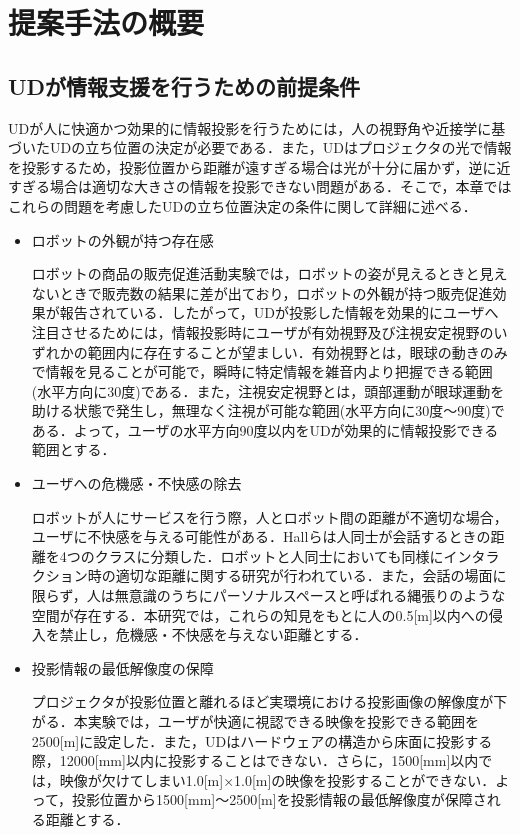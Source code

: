 \documentclass[12pt]{sonota/aislab}
\begin{document}
\section{提案手法の概要}
\subsection{UDが情報支援を行うための前提条件}
UDが人に快適かつ効果的に情報投影を行うためには，人の視野角や近接学に基づいたUDの立ち位置の決定が必要である．また，UDはプロジェクタの光で情報を投影するため，投影位置から距離が遠すぎる場合は光が十分に届かず，逆に近すぎる場合は適切な大きさの情報を投影できない問題がある．そこで，本章ではこれらの問題を考慮したUDの立ち位置決定の条件に関して詳細に述べる．

\begin{itemize}
 \item ロボットの外観が持つ存在感
    
    ロボットの商品の販売促進活動実験\cite{販売促進}では，ロボットの姿が見えるときと見えないときで販売数の結果に差が出ており，ロボットの外観が持つ販売促進効果が報告されている．したがって，UDが投影した情報を効果的にユーザへ注目させるためには，情報投影時にユーザが有効視野及び注視安定視野のいずれかの範囲内に存在することが望ましい．有効視野とは，眼球の動きのみで情報を見ることが可能で，瞬時に特定情報を雑音内より把握できる範囲(水平方向に30度)である．また，注視安定視野とは，頭部運動が眼球運動を助ける状態で発生し，無理なく注視が可能な範囲(水平方向に30度〜90度)である．よって，ユーザの水平方向90度以内をUDが効果的に情報投影できる範囲とする．
    
 \item ユーザへの危機感・不快感の除去
 
    ロボットが人にサービスを行う際，人とロボット間の距離が不適切な場合，ユーザに不快感を与える可能性がある．Hallらは人同士が会話するときの距離を4つのクラスに分類した\cite{Hall}．ロボットと人同士においても同様にインタラクション時の適切な距離に関する研究が行われている\cite{proximity}．また，会話の場面に限らず，人は無意識のうちにパーソナルスペースと呼ばれる縄張りのような空間が存在する．本研究では，これらの知見をもとに人の0.5[m]以内への侵入を禁止し，危機感・不快感を与えない距離とする．
 
 \item 投影情報の最低解像度の保障
 
    プロジェクタが投影位置と離れるほど実環境における投影画像の解像度が下がる．本実験では，ユーザが快適に視認できる映像を投影できる範囲を2500[m]に設定した．また，UDはハードウェアの構造から床面に投影する際，12000[mm]以内に投影することはできない．さらに，1500[mm]以内では，映像が欠けてしまい1.0[m]×1.0[m]の映像を投影することができない．よって，投影位置から1500[mm]〜2500[m]を投影情報の最低解像度が保障される距離とする．
\end{itemize}
\end{document}
